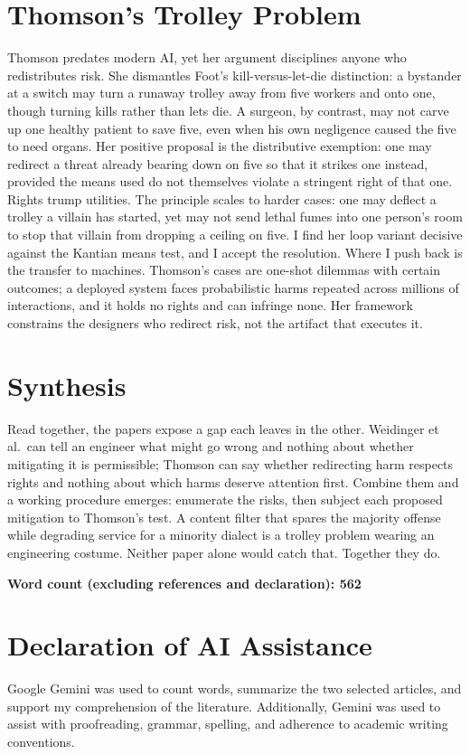 \documentclass[11pt,a4paper]{article}
\begin{document}
\section*{Thomson's Trolley Problem}
Thomson \cite{thomson} predates modern AI, yet her argument disciplines anyone who redistributes risk. She dismantles Foot's kill-versus-let-die distinction: a bystander at a switch may turn a runaway trolley away from five workers and onto one, though turning kills rather than lets die. A surgeon, by contrast, may not carve up one healthy patient to save five, even when his own negligence caused the five to need organs. Her positive proposal is the distributive exemption: one may redirect a threat already bearing down on five so that it strikes one instead, provided the means used do not themselves violate a stringent right of that one. Rights trump utilities. The principle scales to harder cases: one may deflect a trolley a villain has started, yet may not send lethal fumes into one person's room to stop that villain from dropping a ceiling on five. I find her loop variant decisive against the Kantian means test, and I accept the resolution. Where I push back is the transfer to machines. Thomson's cases are one-shot dilemmas with certain outcomes; a deployed system faces probabilistic harms repeated across millions of interactions, and it holds no rights and can infringe none. Her framework constrains the designers who redirect risk, not the artifact that executes it.

\section*{Synthesis}
Read together, the papers expose a gap each leaves in the other. Weidinger et al.\ can tell an engineer what might go wrong and nothing about whether mitigating it is permissible; Thomson can say whether redirecting harm respects rights and nothing about which harms deserve attention first. Combine them and a working procedure emerges: enumerate the risks, then subject each proposed mitigation to Thomson's test. A content filter that spares the majority offense while degrading service for a minority dialect is a trolley problem wearing an engineering costume. Neither paper alone would catch that. Together they do.

\vspace{1em}
\noindent\textbf{Word count (excluding references and declaration): 562}

\section*{Declaration of AI Assistance}
Google Gemini was used to count words, summarize the two selected articles, and support my comprehension of the literature. Additionally, Gemini was used to assist with proofreading, grammar, spelling, and adherence to academic writing conventions.
\end{document}
